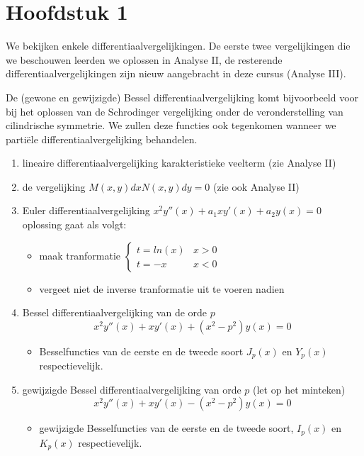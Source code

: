 \documentclass[../../master_thesis/4_written_text/main/main.tex]{subfiles}
\begin{document}
\section{Hoofdstuk 1}
We bekijken enkele differentiaalvergelijkingen. De eerste twee vergelijkingen die we beschouwen leerden we oplossen in Analyse II, de resterende differentiaalvergelijkingen zijn nieuw aangebracht in deze cursus (Analyse III). 

De (gewone en gewijzigde) Bessel differentiaalvergelijking komt bijvoorbeeld voor bij het oplossen van de Schrodinger vergelijking onder de veronderstelling van cilindrische symmetrie. We zullen deze functies ook tegenkomen wanneer we partiële differentiaalvergelijking behandelen.


\begin{enumerate}
\item lineaire differentiaalvergelijking \hfill karakteristieke veelterm (zie Analyse II)

\item de vergelijking $M(x,y)dx  N(x,y)dy = 0$ \hfill
(zie ook Analyse II)

\item Euler differentiaalvergelijking $x^2y''(x) + a_1xy'(x) + a_2y(x) = 0$ \hfill oplossing gaat als volgt:
\begin{itemize}
\item maak tranformatie $\begin{cases} t=ln(x) & x>0\\ t=-x  & x<0 \end{cases}$
\item vergeet niet de inverse tranformatie uit te voeren nadien
\end{itemize}

\item Bessel differentiaalvergelijking van de orde $p$ 
\begin{equation}
x^2y''(x) + xy'(x) + (x^2-p^2)y(x) = 0
\end{equation}
\begin{itemize}
\item Besselfuncties van de eerste en de tweede soort $J_p(x)$ en $Y_p(x)$ respectievelijk.
\end{itemize}

\item gewijzigde Bessel differentiaalvergelijking van orde $p$ (let op het minteken)
\begin{equation}
x^2y''(x) + xy'(x) - (x^2-p^2)y(x) = 0
\end{equation} 
\begin{itemize}
\item gewijzigde Besselfuncties van de eerste en de tweede soort, $I_p(x)$ en $K_p(x)$ respectievelijk.
\end{itemize}

\end{enumerate}
\end{document}
